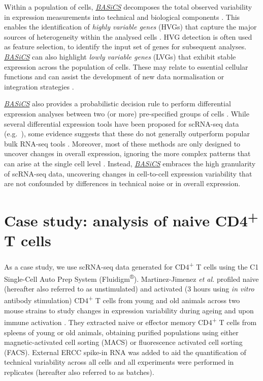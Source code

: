 \documentclass[9pt,a4paper,]{extarticle}
\begin{document}
Within a population of cells, \emph{\href{https://bioconductor.org/packages/3.11/BASiCS}{BASiCS}} decomposes the total
observed variability in expression measurements into technical and biological
components \citep{Vallejos2015}.
This enables the identification of \emph{highly variable genes} (HVGs) that capture
the major sources of heterogeneity within the analysed cells \citep{Brennecke2013}.
HVG detection is often used as feature selection, to identify the input
set of genes for subsequent analyses.
\emph{\href{https://bioconductor.org/packages/3.11/BASiCS}{BASiCS}} can also highlight \emph{lowly variable genes} (LVGs) that
exhibit stable expression across the population of cells.
These may relate to essential cellular functions and can assist the development
of new data normalisation or integration strategies \citep{Lin2019}.

\emph{\href{https://bioconductor.org/packages/3.11/BASiCS}{BASiCS}} also provides a probabilistic decision rule to
perform differential expression analyses between two (or more) pre-specified
groups of cells \citep{Vallejos2016, Eling2018}.
While several differential expression tools have been proposed for scRNA-seq
data (e.g.~\citep{Kharchenko2014, Finak2015}), some evidence suggests that
these do not generally outperform popular bulk RNA-seq tools \citep{Soneson2018}.
Moreover, most of these methods are only designed to uncover changes in overall
expression, ignoring the more complex patterns that can arise at the single cell
level \citep{Lahnemann2020}.
Instead, \emph{\href{https://bioconductor.org/packages/3.11/BASiCS}{BASiCS}} embraces the high granularity of scRNA-seq data,
uncovering changes in cell-to-cell expression variability that are not
confounded by differences in technical noise or in overall expression.

\hypertarget{Tcells}{%
\section{\texorpdfstring{Case study: analysis of naive CD4\textsuperscript{+} T cells}{Case study: analysis of naive CD4+ T cells}}\label{Tcells}}

As a case study, we use scRNA-seq data generated for CD4\textsuperscript{+} T cells
using the C1 Single-Cell Auto Prep System (Fluidigm\textsuperscript{®}).
Martinez-Jimenez \emph{et al.} profiled naive (hereafter also referred to as
unstimulated) and activated (3 hours using \emph{in vitro} antibody stimulation)
CD4\textsuperscript{+} T cells from young and old animals across two mouse strains to study
changes in expression variability during ageing and upon immune activation
\citep{Martinez-jimenez2017}.
They extracted naive or effector memory CD4\textsuperscript{+} T cells from spleens of young or
old animals, obtaining purified populations using either magnetic-activated cell
sorting (MACS) or fluorescence activated cell sorting (FACS).
External ERCC spike-in RNA \citep{Rna2005} was added to aid the quantification of
technical variability across all cells and all experiments were performed in
replicates (hereafter also referred to as batches).
\end{document}
